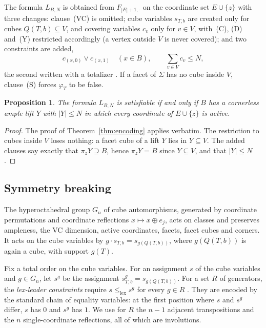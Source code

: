 \documentclass[11pt]{article}
\numberwithin{equation}{section}
\newtheorem{proposition}[theorem]{Proposition}
\theoremstyle{definition}
\theoremstyle{remark}
\begin{document}
The formula \(L_{B,N}\) is obtained from \(F_{|E|+1,\cdot}\) on the
coordinate set \(E\cup\{z\}\) with three changes: clause~(VC) is omitted;
cube variables \(s_{T,b}\) are created only for cubes \(Q(T,b)\subseteq V\),
and covering variables \(c_v\) only for \(v\in V\), with~(C), (D) and~(Y)
restricted accordingly (a vertex outside \(V\) is never covered); and two
constraints are added,
\[
 c_{(x,0)}\vee c_{(x,1)}\quad(x\in B),\qquad
 \sum_{v\in V}c_v\le N,
\]
the second written with a totalizer \cite{BailleuxBoufkhad03}.  If a facet
of \(\Sigma\) has no cube inside \(V\), clause~(S) forces \(\varphi_T\) to
be false.

\begin{proposition}
\label{prop:lift-encoding}
The formula \(L_{B,N}\) is satisfiable if and only if \(B\) has a
cornerless ample lift \(Y\) with \(|Y|\le N\) in which every coordinate of
\(E\cup\{z\}\) is active.
\end{proposition}

\begin{proof}
The proof of Theorem~\ref{thm:encoding} applies verbatim.  The restriction
to cubes inside \(V\) loses nothing: a facet cube of a lift \(Y\) lies in
\(Y\subseteq V\).  The added clauses say exactly that
\(\pi_zY\supseteq B\), hence \(\pi_zY=B\) since \(Y\subseteq V\), and that
\(|Y|\le N\).
\end{proof}

\subsection{Symmetry breaking}
\label{sec:lex}

The hyperoctahedral group \(G_n\) of cube automorphisms, generated by
coordinate permutations and coordinate reflections \(x\mapsto x\oplus e_j\),
acts on classes and preserves ampleness, the VC dimension, active
coordinates, facets, facet cubes and corners.  It acts on the cube
variables by \(g\cdot s_{T,b}=s_{g(Q(T,b))}\), where \(g(Q(T,b))\) is again
a cube, with support \(g(T)\).

Fix a total order on the cube variables.  For an assignment \(s\) of the
cube variables and \(g\in G_n\), let \(s^g\) be the assignment
\(s^g_{T,b}=s_{g(Q(T,b))}\).  For a set \(R\) of generators, the
\emph{lex-leader constraints} require \(s\le_{\mathrm{lex}}s^g\) for every
\(g\in R\) \cite{CrawfordGinsbergLuksRoy96}.  They are encoded by the
standard chain of equality variables: at the first position where \(s\)
and \(s^g\) differ, \(s\) has \(0\) and \(s^g\) has \(1\).  We use for \(R\)
the \(n-1\) adjacent transpositions and the \(n\) single-coordinate
reflections, all of which are involutions.
\end{document}
